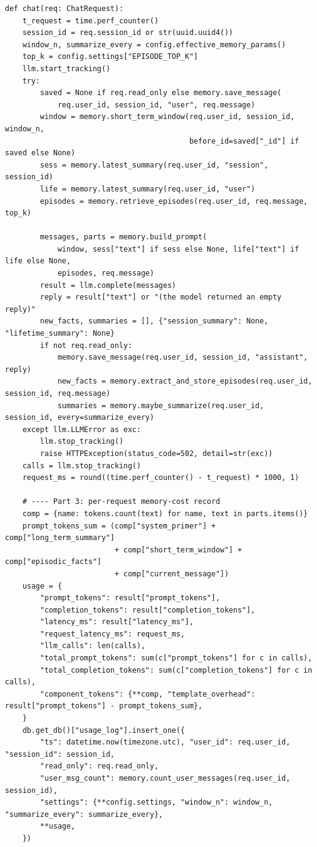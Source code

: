 \documentclass[11pt]{article}
\begin{document}
\begin{lstlisting}
def chat(req: ChatRequest):
    t_request = time.perf_counter()
    session_id = req.session_id or str(uuid.uuid4())
    window_n, summarize_every = config.effective_memory_params()
    top_k = config.settings["EPISODE_TOP_K"]
    llm.start_tracking()
    try:
        saved = None if req.read_only else memory.save_message(
            req.user_id, session_id, "user", req.message)
        window = memory.short_term_window(req.user_id, session_id, window_n,
                                          before_id=saved["_id"] if saved else None)
        sess = memory.latest_summary(req.user_id, "session", session_id)
        life = memory.latest_summary(req.user_id, "user")
        episodes = memory.retrieve_episodes(req.user_id, req.message, top_k)

        messages, parts = memory.build_prompt(
            window, sess["text"] if sess else None, life["text"] if life else None,
            episodes, req.message)
        result = llm.complete(messages)
        reply = result["text"] or "(the model returned an empty reply)"
        new_facts, summaries = [], {"session_summary": None, "lifetime_summary": None}
        if not req.read_only:
            memory.save_message(req.user_id, session_id, "assistant", reply)
            new_facts = memory.extract_and_store_episodes(req.user_id, session_id, req.message)
            summaries = memory.maybe_summarize(req.user_id, session_id, every=summarize_every)
    except llm.LLMError as exc:
        llm.stop_tracking()
        raise HTTPException(status_code=502, detail=str(exc))
    calls = llm.stop_tracking()
    request_ms = round((time.perf_counter() - t_request) * 1000, 1)

    # ---- Part 3: per-request memory-cost record
    comp = {name: tokens.count(text) for name, text in parts.items()}
    prompt_tokens_sum = (comp["system_primer"] + comp["long_term_summary"]
                         + comp["short_term_window"] + comp["episodic_facts"]
                         + comp["current_message"])
    usage = {
        "prompt_tokens": result["prompt_tokens"],
        "completion_tokens": result["completion_tokens"],
        "latency_ms": result["latency_ms"],
        "request_latency_ms": request_ms,
        "llm_calls": len(calls),
        "total_prompt_tokens": sum(c["prompt_tokens"] for c in calls),
        "total_completion_tokens": sum(c["completion_tokens"] for c in calls),
        "component_tokens": {**comp, "template_overhead": result["prompt_tokens"] - prompt_tokens_sum},
    }
    db.get_db()["usage_log"].insert_one({
        "ts": datetime.now(timezone.utc), "user_id": req.user_id, "session_id": session_id,
        "read_only": req.read_only,
        "user_msg_count": memory.count_user_messages(req.user_id, session_id),
        "settings": {**config.settings, "window_n": window_n, "summarize_every": summarize_every},
        **usage,
    })


\end{lstlisting}
\end{document}
